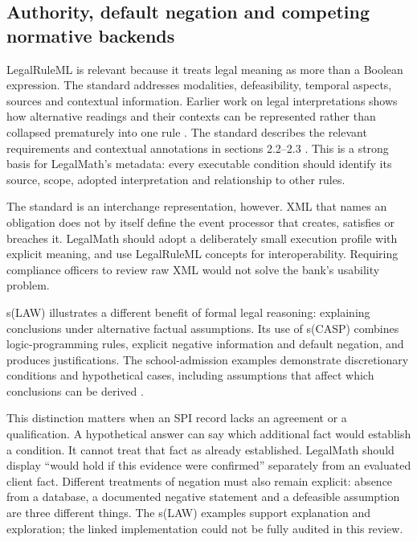 \documentclass[12pt,a4paper,oneside,openany]{book}
\begin{document}
\subsection{Authority, default negation and competing normative backends}
\label{merge:P-02-literature:04}


LegalRuleML is relevant because it treats legal meaning as more than a Boolean
expression. The standard addresses modalities, defeasibility, temporal aspects,
sources and contextual information. Earlier work on legal interpretations shows
how alternative readings and their contexts can be represented rather than
collapsed prematurely into one rule
\citep[sec.~4]{legalinterpretations2014}. The standard describes the relevant
requirements and contextual annotations in sections 2.2--2.3
\citep{legalruleml2021}. This is a strong basis
for LegalMath's metadata: every executable condition should identify its source,
scope, adopted interpretation and relationship to other rules.

The standard is an interchange representation, however. XML that names an
obligation does not by itself define the event processor that creates, satisfies
or breaches it. LegalMath should adopt a deliberately small execution profile
with explicit meaning, and use LegalRuleML concepts for interoperability. Requiring
compliance officers to review raw XML would not solve the bank's usability problem.

s(LAW) illustrates a different benefit of formal legal reasoning: explaining
conclusions under alternative factual assumptions. Its use of s(CASP) combines
logic-programming rules, explicit negative information and default negation, and
produces justifications. The school-admission examples demonstrate discretionary
conditions and hypothetical cases, including assumptions that affect which
conclusions can be derived \citep[secs.~4--5]{slaw2024}.

This distinction matters when an SPI record lacks an agreement or a qualification.
A hypothetical answer can say which additional fact would establish a condition.
It cannot treat that fact as already established. LegalMath should display
``would hold if this evidence were confirmed'' separately from an evaluated
client fact. Different treatments of negation must also remain explicit: absence
from a database, a documented negative statement and a defeasible assumption are
three different things. The s(LAW) examples support explanation and exploration;
the linked implementation could not be fully audited in this review.
\end{document}
